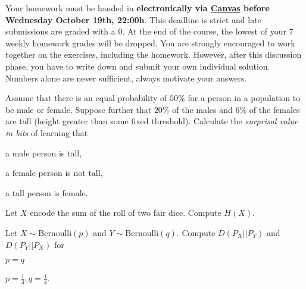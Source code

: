 \documentclass[a4paper,10pt,landscape,twocolumn]{scrartcl}
\newcommand\deadline{Wednesday October 19th, 22:00h}
\begin{document}
\homeworkproblems

{\sffamily\noindent
Your homework must be handed in \textbf{electronically via \href{\canvasURL}{Canvas} before \deadline}. 
This deadline is strict and late submissions are graded with a 0. At the end of the course, the lowest of your 7 weekly homework grades will be dropped. You are strongly encouraged to work together on the exercises, including the homework. However, after this discussion phase, you have to write down and submit your own individual solution. Numbers alone are never sufficient, always motivate your answers.
}

\begin{exercise}
Assume that there is an equal probability of $50\%$ for a person in a population to be male or female. Suppose further that $20\%$ of the males and $6\%$ of the females are tall (height greater than some fixed threshold). Calculate the \emph{surprisal value in bits} of learning that

\begin{subex}
a male person is tall, 
\end{subex}

\begin{subex}
a female person is not tall, 
\end{subex}

\begin{subex}
a tall person is female.
\end{subex}

\end{exercise}

\begin{exercise}
Let $X$ encode the sum of the roll of two fair dice. Compute $H(X)$.
\end{exercise}

\begin{exercise}
Let $X \sim \text{Bernoulli}(p)$ and $Y \sim \text{Bernoulli}(q)$. Compute $D(P_X || P_Y)$ and $D(P_Y || P_X)$ for 

\begin{subex}
$p=q$
\end{subex}

\begin{subex}
$p=\frac 1 3, q=\frac 1 4$.
\end{subex}

\end{exercise}
\end{document}
